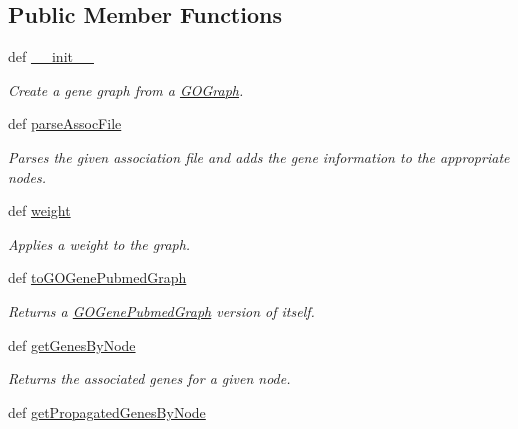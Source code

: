 \subsection*{Public Member Functions}
\begin{DoxyCompactItemize}
\item 
def \hyperlink{class_g_o_gene_graph_1_1_g_o_gene_graph_a37f579f2fd7c2e8f0e52345e5c94233f}{\_\-\_\-init\_\-\_\-}
\begin{DoxyCompactList}\small\item\em Create a gene graph from a \hyperlink{namespace_g_o_graph}{GOGraph}. \item\end{DoxyCompactList}\item 
def \hyperlink{class_g_o_gene_graph_1_1_g_o_gene_graph_a0881964964972853c93e7606b73bb825}{parseAssocFile}
\begin{DoxyCompactList}\small\item\em Parses the given association file and adds the gene information to the appropriate nodes. \item\end{DoxyCompactList}\item 
def \hyperlink{class_g_o_gene_graph_1_1_g_o_gene_graph_a276c7e223374b8c22417e195afacffed}{weight}
\begin{DoxyCompactList}\small\item\em Applies a weight to the graph. \item\end{DoxyCompactList}\item 
def \hyperlink{class_g_o_gene_graph_1_1_g_o_gene_graph_a5f437c2ab06eacde21831786192c4a4e}{toGOGenePubmedGraph}
\begin{DoxyCompactList}\small\item\em Returns a \hyperlink{namespace_g_o_gene_pubmed_graph}{GOGenePubmedGraph} version of itself. \item\end{DoxyCompactList}\item 
def \hyperlink{class_g_o_gene_graph_1_1_g_o_gene_graph_a778128e77640d18bcaf775c2348013d4}{getGenesByNode}
\begin{DoxyCompactList}\small\item\em Returns the associated genes for a given node. \item\end{DoxyCompactList}\item 
def \hyperlink{class_g_o_gene_graph_1_1_g_o_gene_graph_a6179a967c11a89a19dedb768cbb92bc9}{getPropagatedGenesByNode}

\end{DoxyCompactItemize}
